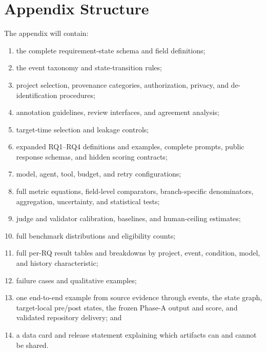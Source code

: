 \documentclass{article} %
\begin{document}



\appendix

\section{Appendix Structure}

The appendix will contain:
\begin{enumerate}
    \item the complete requirement-state schema and field definitions;
    \item the event taxonomy and state-transition rules;
    \item project selection, provenance categories, authorization, privacy, and de-identification procedures;
    \item annotation guidelines, review interfaces, and agreement analysis;
    \item target-time selection and leakage controls;
    \item expanded RQ1--RQ4 definitions and examples, complete prompts, public response schemas, and hidden scoring contracts;
    \item model, agent, tool, budget, and retry configurations;
    \item full metric equations, field-level comparators, branch-specific denominators, aggregation, uncertainty, and statistical tests;
    \item judge and validator calibration, baselines, and human-ceiling estimates;
    \item full benchmark distributions and eligibility counts;
    \item full per-RQ result tables and breakdowns by project, event, condition, model, and history characteristic;
    \item failure cases and qualitative examples;
    \item one end-to-end example from source evidence through events, the state graph, target-local pre/post states, the frozen Phase-A output and score, and validated repository delivery; and
    \item a data card and release statement explaining which artifacts can and cannot be shared.
\end{enumerate}
\end{document}
